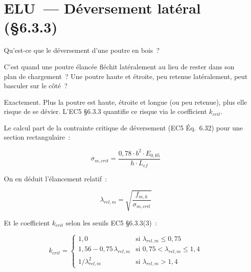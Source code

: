 \documentclass[12pt, a4paper, openany]{book}
\begin{document}
\section{ELU~--- D\'eversement lat\'eral (\S{}6.3.3)}

\begin{maitre}
Qu'est-ce que le d\'eversement d'une poutre en bois~?
\end{maitre}

\begin{apprenti}
C'est quand une poutre \'elanc\'ee fl\'echit lat\'eralement au lieu de
rester dans son plan de chargement~? Une poutre haute et \'etroite,
peu retenue lat\'eralement, peut basculer sur le c\^ot\'e~?
\end{apprenti}

\begin{maitre}
Exactement. Plus la poutre est haute, \'etroite et longue (ou peu retenue),
plus elle risque de se d\'evier. L'EC5 \S{}6.3.3 quantifie ce risque
via le coefficient $k_{crit}$.
\end{maitre}

Le calcul part de la contrainte critique de d\'eversement
(EC5 \'Eq.~6.32) pour une section rectangulaire~:

\begin{equation}
\sigma_{m,crit} = \frac{0{,}78 \cdot b^2 \cdot E_{0,05}}{h \cdot L_{ef}}
\label{eq:sigmacrit}
\end{equation}

On en d\'eduit l'\'elancement relatif~:

\begin{equation}
\lambda_{rel,m} = \sqrt{\frac{f_{m,k}}{\sigma_{m,crit}}}
\label{eq:lambda}
\end{equation}

Et le coefficient $k_{crit}$ selon les seuils EC5 \S{}6.3.3(3)~:

\begin{equation}
k_{crit} = \begin{cases}
1{,}0 & \text{si } \lambda_{rel,m} \leq 0{,}75 \\
1{,}56 - 0{,}75 \, \lambda_{rel,m} & \text{si } 0{,}75 < \lambda_{rel,m} \leq 1{,}4 \\
1/\lambda_{rel,m}^2 & \text{si } \lambda_{rel,m} > 1{,}4
\end{cases}
\label{eq:kcrit}
\end{equation}
\end{document}
